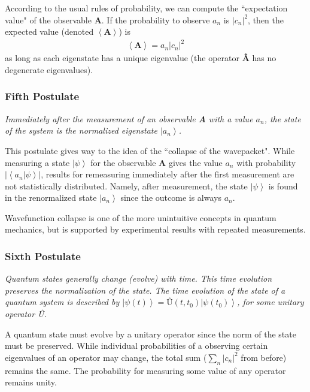 \documentclass[11pt]{article} %
\newcommand{\ket}[1]{\left|#1\right\rangle}
\newcommand{\braket}[2]{\left\langle#1 |  #2\right\rangle}
\begin{document}
According to the usual rules of probability, we can compute the ``expectation value" of the observable \textbf{A}. If the probability to observe $a_n$ is $\left|c_n\right|^2$, then the expected value
(denoted $\left<\textbf{A}\right>$) is
\begin{align}
    \left<\textbf{A}\right> = a_n\left|c_n\right|^2
\end{align}
as long as each eigenstate has a unique eigenvalue (the operator \textbf{\^A} has no degenerate eigenvalues).

\subsubsection{Fifth Postulate}
\begin{center}
    \textit{Immediately after the measurement of an observable \textbf{A} with a value $a_n$, the state of the system is the normalized eigenstate $\ket{a_n}$.}
\end{center}

This postulate gives way to the idea of the ``collapse of the wavepacket". While measuring a state $\ket{\psi}$ for the observable \textbf{A} gives the value $a_n$ with probability $\left|\braket{a_n}{\psi}\right|$, results for remeasuring immediately after the first measurement are not statistically distributed. Namely, after measurement, the state $\ket{\psi}$ is found in the renormalized state $\ket{a_n}$ since the outcome is always $a_n$.

Wavefunction collapse is one of the more unintuitive concepts in quantum mechanics, but is supported by experimental results with repeated measurements.

\subsubsection{Sixth Postulate}
\begin{center}
    \textit{Quantum states generally change (evolve) with time. This time evolution preserves the normalization of the state. The time evolution of the state of a quantum system is described by $\ket{\psi(t)} = \textbf{\^U}(t,t_0)\ket{\psi(t_0)}$, for some unitary operator \^U.}
\end{center}

A quantum state must evolve by a unitary operator since the norm of the state must be preserved. While individual probabilities of a observing certain eigenvalues of an operator may change, the total sum ($\sum_n\left|c_n\right|^2$ from before) remains the same. The probability for measuring some value of any operator remains unity.
\end{document}
